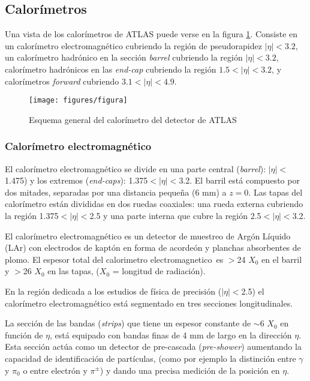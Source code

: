 \subsection{Calorímetros}

Una vista de los calorímetros de ATLAS puede verse en la figura \ref{fig:calo}. Consiste en un calorímetro electromagnético cubriendo la región de pseudorapidez $|\eta| < 3.2$, un calorímetro hadrónico en la sección \emph{barrel} cubriendo la región $|\eta| < 3.2$, calorímetro hadrónicos en las \emph{end-cap} cubriendo la región $1.5 < |\eta| < 3.2$, y calorímetros \emph{forward} cubriendo $3.1 < |\eta| < 4.9$.

\begin{figure}[H]
  \centering
  \texttt{[image: figures/figura]}
  \caption{Esquema general del calorímetro del detector de ATLAS}\label{fig:calo}
\end{figure}


\subsubsection{Calorímetro electromagnético}
El calorímetro electromagnético \cite{caloemTDR} se divide en una parte central
(\emph{barrel}): $|\eta|<$1.475) y los extremos (\emph{end-caps}): 1.375$<|\eta|<$3.2.
El barril está compuesto por dos mitades, separadas por una distancia pequeña (6 mm) a $z = 0$.
Las tapas del calorímetro están divididas en dos ruedas coaxiales: una rueda
externa cubriendo la región 1.375$<|\eta|<$2.5 y una parte interna que cubre la
región 2.5$<|\eta|<$3.2.

El calorímetro electromagnético es un detector de muestreo de Argón Líquido (LAr)
con electrodos de kaptón en forma de acordeón y planchas absorbentes de plomo.
El espesor total del calorimetro electromagnetico\ es $>$24 $X_0$ en el barril
y $>$26 $X_0$ en las tapas, ($X_0$ = longitud de radiación).

En la región dedicada a los estudios de física de precisión ($|\eta|<$2.5) el
calorímetro electromagnético está segmentado en tres secciones longitudinales.%



La sección de las bandas (\emph{strips}) que tiene un espesor constante de $\sim$6 $X_0$ en función de $\eta$, está equipado con bandas finas de 4 mm de largo en la dirección $\eta$.
Esta sección actúa como un detector de pre-cascada (\emph{pre-shower}) aumentando la capacidad de identificación de partículas, (como por ejemplo la distinción entre $\gamma$ y $\pi_0$ o entre electrón y $\pi^\pm$) y dando una precisa medición de la posición en $\eta$.

